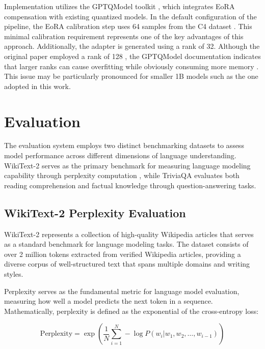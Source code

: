 Implementation utilizes the GPTQModel toolkit \cite{gptqmodel}, which integrates EoRA compensation with existing quantized models. In the default configuration of the pipeline, the EoRA calibration step uses 64 samples from the C4 dataset \cite{c4}. This minimal calibration requirement represents one of the key advantages of this approach. Additionally, the adapter is generated using a rank of 32. Although the original paper employed a rank of 128 \cite{eora}, the GPTQModel documentation indicates that larger ranks can cause overfitting while obviously consuming more memory \cite{gptqmodel}. This issue may be particularly pronounced for smaller 1B models such as the one adopted in this work.


\section{Evaluation} \label{evaluation}

The evaluation system employs two distinct benchmarking datasets to assess model performance across different dimensions of language understanding. WikiText-2 \cite{wikitext} serves as the primary benchmark for measuring language modeling capability through perplexity computation \cite{perplexity}, while TriviaQA \cite{triviaqa} evaluates both reading comprehension and factual knowledge through question-answering tasks.

\subsection{WikiText-2 Perplexity Evaluation}

WikiText-2 \cite{wikitext} represents a collection of high-quality Wikipedia articles that serves as a standard benchmark for language modeling tasks. The dataset consists of over 2 million tokens extracted from verified Wikipedia articles, providing a diverse corpus of well-structured text that spans multiple domains and writing styles.

Perplexity serves as the fundamental metric for language model evaluation, measuring how well a model predicts the next token in a sequence. Mathematically, perplexity is defined as the exponential of the cross-entropy loss:

\begin{equation}
\text{Perplexity} = \exp\left(\frac{1}{N} \sum_{i=1}^{N} -\log P(w_i | w_1, w_2, \ldots, w_{i-1})\right)
\end{equation}

